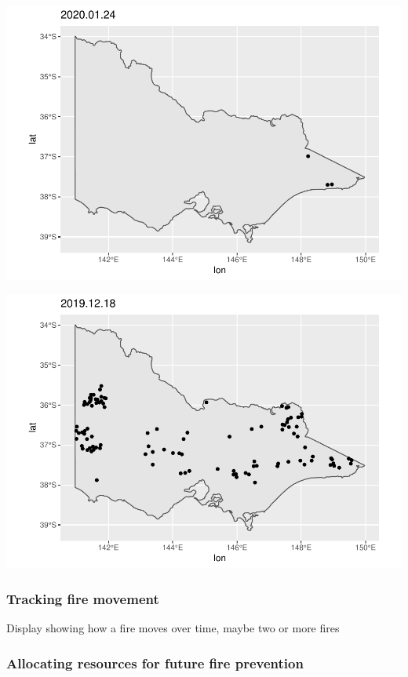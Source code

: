 \begin{Schunk}

\includegraphics[width=0.8\linewidth]{clustering_paper_files/figure-latex/unnamed-chunk-5-1} \end{Schunk}

\begin{Schunk}

\includegraphics[width=0.8\linewidth]{clustering_paper_files/figure-latex/unnamed-chunk-6-1} \end{Schunk}

\hypertarget{tracking-fire-movement}{%
\subsubsection{Tracking fire movement}\label{tracking-fire-movement}}

Display showing how a fire moves over time, maybe two or more fires

\hypertarget{allocating-resources-for-future-fire-prevention}{%
\subsubsection{Allocating resources for future fire
prevention}\label{allocating-resources-for-future-fire-prevention}}

